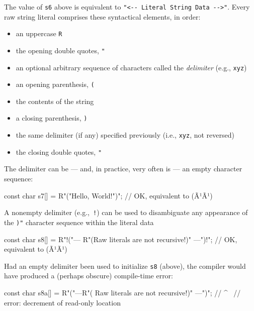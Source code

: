 \noindent The value of \lstinline!s6! above is equivalent to
\lstinline!"<--!~\lstinline!Literal!~\lstinline!String!~\lstinline!Data!~\lstinline!-->"!.
Every raw string literal comprises these syntactical elements, in order:
\begin{itemize}
\item{an uppercase \lstinline!R!}
\item{the opening double quotes, \lstinline!"!} 
\item{an optional arbitrary sequence of characters called the \emph{delimiter} (e.g., \lstinline!xyz!)}
\item{an opening parenthesis, \lstinline!(!}
\item{the contents of the string}
\item{a closing parenthesis, \lstinline!)!}
\item{the same delimiter (if any) specified previously (i.e., \lstinline!xyz!, not reversed)} 
\item{the closing double quotes, \lstinline!"!}
\end{itemize}

The delimiter can be --- and, in practice, very often is --- an empty character
sequence:

\begin{emcppslisting}[language=C++]
const char s7[] = R"("Hello, World!")";
    // OK, equivalent to (Ã¹{}Ã¹)
\end{emcppslisting}
    
\noindent A nonempty delimiter (e.g.,~\lstinline|!|) can be used to disambiguate any
appearance of the \lstinline!)"! character sequence within the literal data

\begin{emcppslisting}[language=C++]
const char s8[] = R"!("--- R"(Raw literals are not recursive!)" ---")!";
    // OK, equivalent to (Ã¹{}Ã¹)
\end{emcppslisting}
    
\noindent Had an empty delimiter been used to initialize \lstinline!s8! (above), the
compiler would have produced a (perhaps obscure) compile-time error:

%
\begin{emcppslisting}[language=C++]
const char s8a[] = R"("---R"( Raw literals are not recursive!)" ---")";         
//                                                                ^~            
// error: decrement of read-only location
\end{emcppslisting}
    
